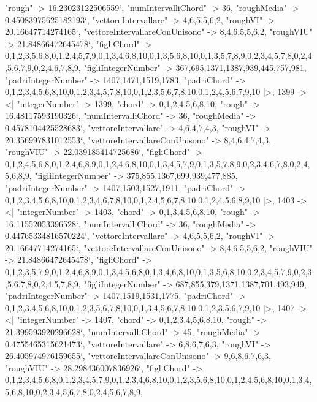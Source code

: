 \documentclass[
]{article}
\begin{document}
\begin{DatasetVerbatim}
    "rough" -> 16.23023122506559`,
    "numIntervalliChord" -> 36,
    "roughMedia" -> 0.45083975625182193`,
    "vettoreIntervallare" -> {4,6,5,5,6,2},
    "roughVI" -> 20.16647714274165`,
    "vettoreIntervallareConUnisono" -> {8,4,6,5,5,6,2},
    "roughVIU" -> 21.84866472645478`,
    "figliChord" -> {{0,1,2,3,5,6,8},{0,1,2,4,5,7,9},{0,1,3,4,6,8,10},{0,1,3,5,6,8,10},{0,1,3,5,7,8,9},{0,2,3,4,5,7,8},{0,2,4,5,6,7,9},{0,2,4,6,7,8,9}},
    "figliIntegerNumber" -> {367,695,1371,1387,939,445,757,981},
    "padriIntegerNumber" -> {1407,1471,1519,1783},
    "padriChord" -> {{0,1,2,3,4,5,6,8,10},{0,1,2,3,4,5,7,8,10},{0,1,2,3,5,6,7,8,10},{0,1,2,4,5,6,7,9,10}}
  |>,
  1399 -> <|
    "integerNumber" -> 1399,
    "chord" -> {0,1,2,4,5,6,8,10},
    "rough" -> 16.48117593190326`,
    "numIntervalliChord" -> 36,
    "roughMedia" -> 0.4578104425528683`,
    "vettoreIntervallare" -> {4,6,4,7,4,3},
    "roughVI" -> 20.356997831012553`,
    "vettoreIntervallareConUnisono" -> {8,4,6,4,7,4,3},
    "roughVIU" -> 22.039185414725686`,
    "figliChord" -> {{0,1,2,4,5,6,8},{0,1,2,4,6,8,9},{0,1,2,4,6,8,10},{0,1,3,4,5,7,9},{0,1,3,5,7,8,9},{0,2,3,4,6,7,8},{0,2,4,5,6,8,9}},
    "figliIntegerNumber" -> {375,855,1367,699,939,477,885},
    "padriIntegerNumber" -> {1407,1503,1527,1911},
    "padriChord" -> {{0,1,2,3,4,5,6,8,10},{0,1,2,3,4,6,7,8,10},{0,1,2,4,5,6,7,8,10},{0,1,2,4,5,6,8,9,10}}
  |>,
  1403 -> <|
    "integerNumber" -> 1403,
    "chord" -> {0,1,3,4,5,6,8,10},
    "rough" -> 16.11552053396528`,
    "numIntervalliChord" -> 36,
    "roughMedia" -> 0.44765334816570224`,
    "vettoreIntervallare" -> {4,6,5,5,6,2},
    "roughVI" -> 20.16647714274165`,
    "vettoreIntervallareConUnisono" -> {8,4,6,5,5,6,2},
    "roughVIU" -> 21.84866472645478`,
    "figliChord" -> {{0,1,2,3,5,7,9},{0,1,2,4,6,8,9},{0,1,3,4,5,6,8},{0,1,3,4,6,8,10},{0,1,3,5,6,8,10},{0,2,3,4,5,7,9},{0,2,3,5,6,7,8},{0,2,4,5,7,8,9}},
    "figliIntegerNumber" -> {687,855,379,1371,1387,701,493,949},
    "padriIntegerNumber" -> {1407,1519,1531,1775},
    "padriChord" -> {{0,1,2,3,4,5,6,8,10},{0,1,2,3,5,6,7,8,10},{0,1,3,4,5,6,7,8,10},{0,1,2,3,5,6,7,9,10}}
  |>,
  1407 -> <|
    "integerNumber" -> 1407,
    "chord" -> {0,1,2,3,4,5,6,8,10},
    "rough" -> 21.399593920296628`,
    "numIntervalliChord" -> 45,
    "roughMedia" -> 0.4755465315621473`,
    "vettoreIntervallare" -> {6,8,6,7,6,3},
    "roughVI" -> 26.405974976159655`,
    "vettoreIntervallareConUnisono" -> {9,6,8,6,7,6,3},
    "roughVIU" -> 28.298436007836926`,
    "figliChord" -> {{0,1,2,3,4,5,6,8},{0,1,2,3,4,5,7,9},{0,1,2,3,4,6,8,10},{0,1,2,3,5,6,8,10},{0,1,2,4,5,6,8,10},{0,1,3,4,5,6,8,10},{0,2,3,4,5,6,7,8},{0,2,4,5,6,7,8,9}},

\end{DatasetVerbatim}
\end{document}

